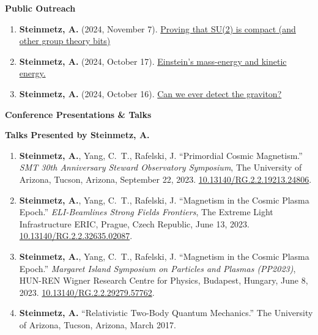 \documentclass[11pt]{article}
\begin{document}
\medskip

{\large\textbf{Public Outreach}}

\begin{enumerate}[leftmargin=*,nosep]
    \item \textbf{Steinmetz, A.} (2024, November 7). \href{https://ajsteinmetz.github.io/mathematics/2024/11/07/su2-compactness.html}{Proving that SU(2) is compact (and other group theory bits)}
    \item \textbf{Steinmetz, A.} (2024, October 17). \href{https://ajsteinmetz.github.io/physics/2024/10/17/kinetic-energy-coefficient.html}{Einstein’s mass-energy and kinetic energy.}
    \item \textbf{Steinmetz, A.} (2024, October 16). \href{https://ajsteinmetz.github.io/physics/2024/10/16/graviton-detector.html}{Can we ever detect the graviton?}
\end{enumerate}

\medskip

{\Large\textbf{Conference Presentations \& Talks}}

{\large\textbf{Talks Presented by Steinmetz, A.}}

\begin{enumerate}[leftmargin=*,nosep]
    \item \textbf{Steinmetz, A.}, Yang, C.~T., Rafelski, J. ``Primordial Cosmic Magnetism.'' \textit{SMT 30th Anniversary Steward Observatory Symposium}, The University of Arizona, Tucson, Arizona, September 22, 2023. \href{http://dx.doi.org/10.13140/RG.2.2.19213.24806}{10.13140/RG.2.2.19213.24806}.
    \item \textbf{Steinmetz, A.}, Yang, C.~T., Rafelski, J. ``Magnetism in the Cosmic Plasma Epoch.'' \textit{ELI-Beamlines Strong Fields Frontiers}, The Extreme Light Infrastructure ERIC, Prague, Czech Republic, June 13, 2023. \href{http://dx.doi.org/10.13140/RG.2.2.32635.02087}{10.13140/RG.2.2.32635.02087}.
    \item \textbf{Steinmetz, A.}, Yang, C.~T., Rafelski, J. ``Magnetism in the Cosmic Plasma Epoch.'' \textit{Margaret Island Symposium on Particles and Plasmas (PP2023)}, HUN-REN Wigner Research Centre for Physics, Budapest, Hungary, June 8, 2023. \href{http://dx.doi.org/10.13140/RG.2.2.29279.57762}{10.13140/RG.2.2.29279.57762}.
    \item \textbf{Steinmetz, A.} ``Relativistic Two-Body Quantum Mechanics.'' The University of Arizona, Tucson, Arizona, March 2017.
\end{enumerate}
\end{document}
